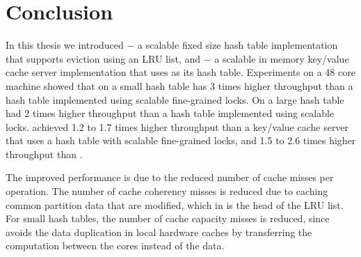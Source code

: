 \section{Conclusion}

In this thesis we introduced \cphash{} $-$ a scalable fixed size hash table implementation that supports eviction
using an LRU list, and \cpserver{} $-$ a scalable in memory key/value cache server implementation that uses \cphash{}
as its hash table. 
Experiments on a 48 core machine showed that on a small hash table \cphash{} has 3 times higher throughput than a hash
table implemented using scalable fine-grained locks. On a large hash table \cphash{} had 2 times higher throughput than
a hash table implemented using scalable locks. 
\cpserver{} achieved 1.2 to 1.7 times higher throughput than a key/value cache server 
that uses a hash table with scalable fine-grained locks, and 1.5 to 2.6 times higher throughput than \memcached{}.

The improved performance is due to the reduced number of cache misses per operation. The number of cache coherency misses
is reduced due to caching common partition data that are modified, which in \cphash{} is the head of the LRU list. 
For small hash tables, the number of cache capacity misses is reduced, since \cphash{} avoids the data duplication in local hardware
caches by transferring the computation between the cores instead of the data.

